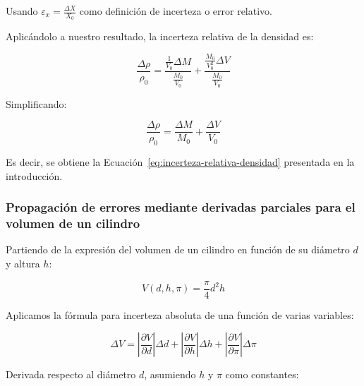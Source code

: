 Usando $\varepsilon_x = \frac{\Delta X}{X_0}$ como definición de incerteza o error relativo.

Aplicándolo a nuestro resultado, la incerteza relativa de la densidad es:

\begin{equation}
    \frac{\Delta \rho}{\rho_0} = \frac{\frac{1}{V_0} \Delta M}{\frac{M_0}{V_0}} + \frac{\frac{M_0}{V_0^2} \Delta V}{\frac{M_0}{V_0}}
    \label{eq:incerteza-relativa-desarrollo}
\end{equation}

Simplificando:

\begin{equation}
    \frac{\Delta \rho}{\rho_0} = \frac{\Delta M}{M_0} + \frac{\Delta V}{V_0}
    \label{eq:incerteza-relativa-simplificada}
\end{equation}

Es decir, se obtiene la Ecuación~\eqref{eq:incerteza-relativa-densidad} presentada en la introducción.


\clearpage
\subsubsection{Propagación de errores mediante derivadas parciales para el volumen de un cilindro}
\label{subsubsec:propagacion-errores-volumen-cilindro}

Partiendo de la expresión del volumen de un cilindro en función de su diámetro $d$ y altura $h$:

\begin{equation}
    V(d, h, \pi) = \frac{\pi}{4} d^2 h
    \label{eq:funcion-volumen-cilindro}
\end{equation}

Aplicamos la fórmula para incerteza absoluta de una función de varias variables:

\begin{equation}
    \Delta V = \left| \frac{\partial V}{\partial d} \right| \Delta d + \left| \frac{\partial V}{\partial h} \right| \Delta h + \left| \frac{\partial V}{\partial \pi} \right| \Delta \pi
    \label{eq:incerteza-general-volumen}
\end{equation}

Derivada respecto al diámetro $d$, asumiendo $h$ y $\pi$ como constantes:

